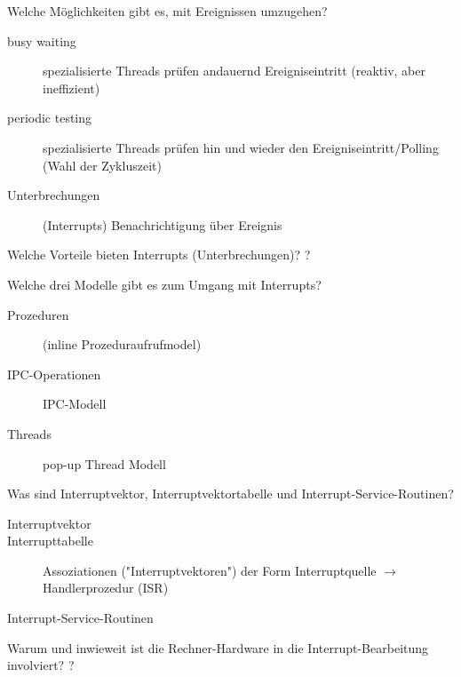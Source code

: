 \documentclass[avery5371]{flashcards}
\begin{document}
\begin{flashcard}{Welche Möglichkeiten gibt es, mit Ereignissen umzugehen?}
    \begin{description}
        \item[busy waiting] spezialisierte Threads prüfen andauernd Ereigniseintritt (reaktiv, aber ineffizient)
        \item[periodic testing] spezialisierte Threads prüfen hin und wieder den Ereigniseintritt/Polling (Wahl der Zykluszeit)
        \item[Unterbrechungen] (Interrupts) Benachrichtigung über Ereignis
    \end{description}
\end{flashcard}

\begin{flashcard}{Welche Vorteile bieten Interrupts (Unterbrechungen)?}
    ?
\end{flashcard}

\begin{flashcard}{Welche drei Modelle gibt es zum Umgang mit Interrupts?}
    \begin{description}
        \item[Prozeduren] (inline Prozeduraufrufmodel)
        \item[IPC-Operationen] IPC-Modell
        \item[Threads] pop-up Thread Modell
    \end{description}
\end{flashcard}

\begin{flashcard}{Was sind Interruptvektor, Interruptvektortabelle und Interrupt-Service-Routinen?}
    \begin{description}
        \item[Interruptvektor]
        \item[Interrupttabelle] Assoziationen ("Interruptvektoren") der Form Interruptquelle $\rightarrow$ Handlerprozedur (ISR)
        \item[Interrupt-Service-Routinen]
    \end{description}
\end{flashcard}

\begin{flashcard}{Warum und inwieweit ist die Rechner-Hardware in die Interrupt-Bearbeitung involviert?}
    ?
\end{flashcard}
\end{document}
